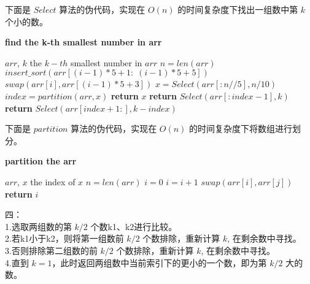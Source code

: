\documentclass{article}
\begin{document}
\newpage
下面是 $Select$ 算法的伪代码，实现在 $O(n)$ 的时间复杂度下找出一组数中第 $k$ 个小的数。 
\begin{algorithm}
    \caption{\textbf{find the k-th smallest number in arr}}
    \label{alg:search_k-th_small}
    \begin{algorithmic}[1]
        \REQUIRE $arr$, $k$
        \ENSURE the $k-th$ smallest number in $arr$
        \STATE $n = len(arr)$
        \STATE $insert\_sort(arr[(i - 1)*5 + 1:\; (i - 1)*5 + 5])$
        \STATE $swap(arr[i], arr[(i -1)*5 + 3])$
        \ENDFOR
        \STATE $x = Select(arr[: n // 5], n / 10)$
        \STATE $index = partition(arr, x)$
        \STATE \textbf{return} $x$
        \STATE \textbf{return} $Select(arr[: index -1 ], k)$
        \ELSE 
        \STATE \textbf{return} $Select(arr[index + 1:], k - index)$      
        \ENDIF  
    \end{algorithmic}
\end{algorithm}

\newpage
下面是 $partition$ 算法的伪代码，实现在 $O(n)$ 的时间复杂度下将数组进行划分。
\begin{algorithm}
    \caption{\textbf{partition the arr}}
    \label{alg:partition}
    \begin{algorithmic}[1]
        \REQUIRE $arr$, $x$
        \ENSURE the index of $x$
        \STATE $n = len(arr)$
        \STATE $i = 0$
        \STATE $i = i + 1$
        \STATE $swap(arr[i], arr[j])$
        \ENDIF
        \ENDFOR
        \STATE \textbf{return} $i$
    \end{algorithmic}
\end{algorithm}

\newpage
四：
\\
1.选取两组数的第 $k / 2$ 个数k1、k2进行比较。
\\
2.若k1小于k2，则将第一组数前 $k / 2$ 个数排除，重新计算 $k$, 在剩余数中寻找。
\\
3.否则排除第二组数的前 $k / 2$ 个数排除，重新计算 $k$, 在剩余数中寻找。
\\
4.直到 $k = 1$，此时返回两组数中当前索引下的更小的一个数，即为第 $k / 2$ 大的数。
\end{document}
